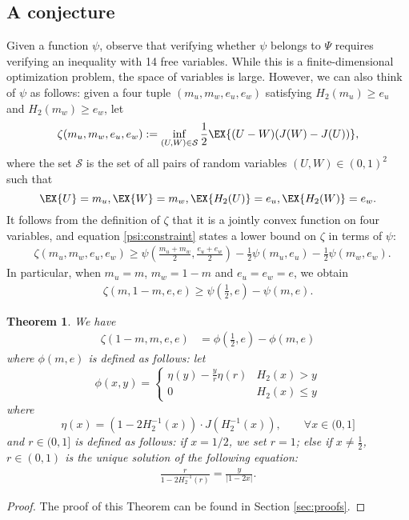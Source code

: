 \documentclass[conference,letterpaper,onecolumn]{IEEEtran}
\theoremstyle{plain}%
\newtheorem{thm}{Theorem}
\begin{document}
\subsection{A conjecture}
Given a function $\psi$, observe that verifying whether $\psi$ belongs to $\Psi$ requires verifying an inequality with 14 free variables. While this is a finite-dimensional optimization problem, the space of variables is large. However, we can also think of $\psi$ as follows: given a four tuple $(m_u,m_w,e_u,e_w)$ satisfying $H_2(m_u)\geq e_u$ and $H_2(m_w)\geq e_w$, let 
$$\zeta(m_u,m_w,e_u,e_w) := \inf_{(U,W)\in \mathcal{S}}\frac 12 \EX{(U-W)(J(W)-J(U))},$$ where the set $\mathcal{S}$ is the set of all pairs of random variables $(U,W)\in(0,1)^2$ such that 
\[\EX{U}=m_u, \EX{W}=m_w, \EX{H_2(U)}=e_u, \EX{H_2(W)}=e_w.\]
It follows from the definition of $\zeta$ that it is a jointly convex function on four variables, and equation \eqref{psi:constraint} states a lower bound on $\zeta$ in terms of $\psi$:
\begin{align*}&\zeta(m_u,m_w,e_u,e_w)\geq \psi\left(\frac{m_u+m_w}{2},\frac{e_u+e_w}{2}\right)-  \frac 12 \psi(m_u,e_u) -  \frac 12 \psi(m_w,e_w).
\end{align*}
In particular, when $m_u=m$, $m_w=1-m$ and $e_u=e_w=e$, we obtain
\begin{align}
\zeta(m,1-m,e,e)\geq \psi\left(\frac{1}{2},e\right)- \psi(m,e).\label{eqnN}
\end{align}
\begin{thm}\label{thm24}
We have
\begin{align*}
    \zeta(1-m, m, e, e)&=\phi\left(\frac12,e\right)-\phi(m,e)
    \end{align*}
    where $\phi(m,e)$ is defined as follows:
    let
$$\phi(x,y) = \begin{cases}
    \eta(y) - \frac{y}{r}\eta(r)&H_2(x)>y\\
    0& H_2(x)\leq y
\end{cases}$$
where $$\eta(x) = (1-2H_2^{-1}(x))\cdot J(H_2^{-1}(x)),\qquad\forall x\in (0,1]$$
and 
$r\in(0,1]$ is defined as follows: if $x=1/2$, we set $r=1$; else if $x\neq \frac12$, $r\in(0,1)$ is the unique solution of the following equation:
\begin{align}
    \frac{r}{1-2H_2^{-1}(r)}=\frac{y}{|1-2x|}.\label{defreq}
\end{align}


\end{thm}

\begin{proof}
    The proof of this Theorem can be found in Section \ref{sec:proofs}.
\end{proof}
\end{document}
